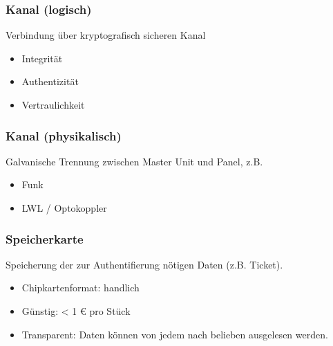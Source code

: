 \begin{frame}
	\frametitle{Kanal (logisch)}
	Verbindung über kryptografisch sicheren Kanal
	\begin{itemize}
		\item<2-> Integrität
		\item<3-> Authentizität
		\item<4-> Vertraulichkeit
	\end{itemize}
\end{frame}

\begin{frame}
	\frametitle{Kanal (physikalisch)}
	Galvanische Trennung zwischen Master Unit und Panel, z.B.
	\begin{itemize}
		\item<2-> Funk
		\item<3-> LWL / Optokoppler
	\end{itemize}
\end{frame}

\begin{frame}
	\frametitle{Speicherkarte}
	Speicherung der zur Authentifierung nötigen Daten (z.B. Ticket).
	\begin{itemize}
		\item<2-> Chipkartenformat: handlich
		\item<3-> Günstig: < 1 \euro{} pro Stück
		\item<4-> Transparent: Daten können von jedem nach belieben ausgelesen werden.
	\end{itemize}
\end{frame}